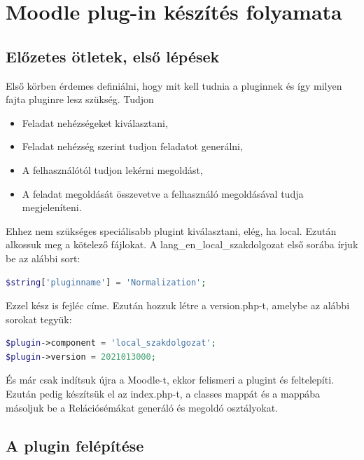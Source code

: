 \chapter{Moodle plug-in készítés folyamata}

\section{Előzetes ötletek, első lépések}

Első körben érdemes definiálni, hogy mit kell tudnia a pluginnek és így milyen fajta pluginre lesz szükség. Tudjon
\begin{itemize}
    \item Feladat nehézségeket kiválasztani,
    \item Feladat nehézség szerint tudjon feladatot generálni,
    \item A felhasználótól tudjon lekérni megoldást,
    \item A feladat megoldását összevetve a felhasználó megoldásával tudja megjeleníteni.
\end{itemize}

Ehhez nem szükséges speciálisabb plugint kiválasztani, elég, ha local. Ezután alkossuk meg a kötelező fájlokat. A lang\_en\_local\_szakdolgozat első sorába írjuk be az alábbi sort:

\begin{lstlisting}[language=php]
$string['pluginname'] = 'Normalization';
\end{lstlisting}

Ezzel kész is fejléc címe. Ezután hozzuk létre a version.php-t, amelybe az alábbi sorokat tegyük:

\begin{lstlisting}[language=php]
$plugin->component = 'local_szakdolgozat';
$plugin->version = 2021013000;
\end{lstlisting}

És már csak indítsuk újra a Moodle-t, ekkor felismeri a plugint és feltelepíti. Ezután pedig készítsük el az index.php-t, a classes mappát és a mappába másoljuk be a Relációsémákat generáló és megoldó osztályokat.

\section{A plugin felépítése}


